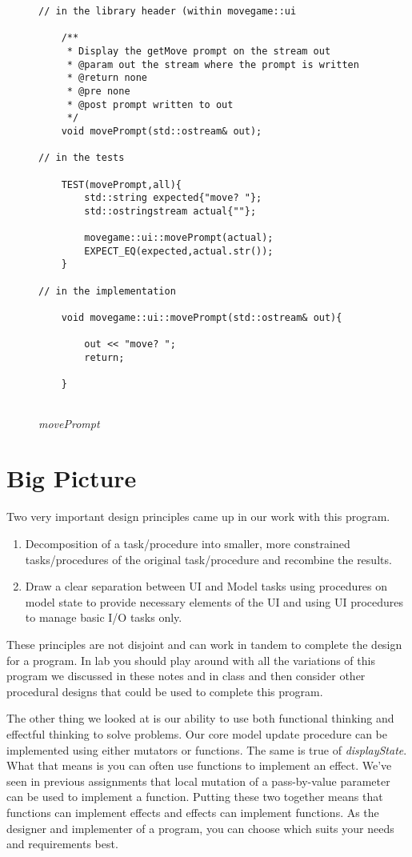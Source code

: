\documentclass[nobib]{tufte-handout}
\begin{document}
\begin{figure}[!htbp]
\begin{lstlisting}
// in the library header (within movegame::ui

    /**
     * Display the getMove prompt on the stream out
     * @param out the stream where the prompt is written
     * @return none
     * @pre none
     * @post prompt written to out
     */
    void movePrompt(std::ostream& out);

// in the tests
 	
 	TEST(movePrompt,all){
    	std::string expected{"move? "};
    	std::ostringstream actual{""};

	    movegame::ui::movePrompt(actual);
  	    EXPECT_EQ(expected,actual.str());
  	}

// in the implementation

	void movegame::ui::movePrompt(std::ostream& out){
		
		out << "move? ";
		return;
		
	}
	
\end{lstlisting}
\caption{\textit{movePrompt}}
\label{fig:mvprmt}
\end{figure}



\section{Big Picture}

Two very important design principles came up in our work with this program. 
\begin{enumerate}
\item Decomposition of a task/procedure into smaller, more constrained tasks/procedures of the original task/procedure and recombine the results.
\item Draw a clear separation between UI and Model tasks using procedures on model state to provide necessary elements of the UI and using UI procedures to manage basic I/O tasks only. 
\end{enumerate}
These principles are not disjoint and can work in tandem to complete the design for a program. In lab you should play around with all the variations of this program we discussed in these notes and in class and then consider other procedural designs that could be used to complete this program.

The other thing we looked at is our ability to use both functional thinking and effectful thinking to solve problems. Our core model update procedure can be implemented using either mutators or functions. The same is true of \textit{displayState}.  What that means is you can often use functions to implement an effect. We've seen in previous assignments that local mutation of a pass-by-value parameter can be used to implement a function. Putting these two together means that functions can implement effects and effects can implement functions. As the designer and implementer of a program, you can choose which suits your needs and requirements best. 
\end{document}
